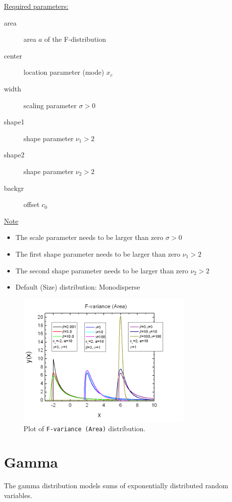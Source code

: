 \vspace{5mm}
\underline{Required parameters:}
\begin{description}
    \item[area] area $a$ of the F-distribution
    \item[center] location parameter (mode) $x_c$
    \item[width] scaling parameter $\sigma>0$
    \item[shape1] shape parameter $\nu_1>2$
    \item[shape2] shape parameter $\nu_2>2$
    \item[backgr] offset $c_0$
\end{description}

\underline{Note}
\begin{itemize}
  \item The scale parameter needs to be larger than zero $\sigma>0$
  \item The first shape parameter needs to be larger than zero $\nu_1>2$
  \item The second shape parameter needs to be larger than zero $\nu_2>2$
  \item Default (Size) distribution: Monodisperse
\end{itemize}

\begin{figure}[htb]
\begin{center}
\includegraphics[width=0.768\textwidth]{FvarianceArea.png}
\end{center}
\caption{Plot of \texttt{F-variance (Area)} distribution.}
\label{fig:FVarianceArea}
\end{figure}

\clearpage
\section{Gamma}
\label{sec:GammaDistr}
The gamma distribution models sums of exponentially distributed random variables.

